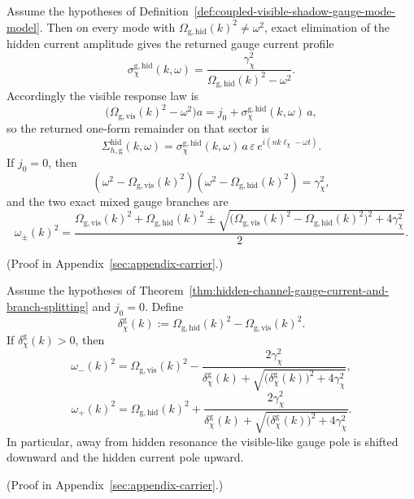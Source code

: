 \begin{theorem}
\label{thm:hidden-channel-gauge-current-and-branch-splitting}
Assume the hypotheses of
Definition~\ref{def:coupled-visible-shadow-gauge-mode-model}. Then on every
mode with \(\Omega_{\mathrm{g,hid}}(k)^2\neq\omega^2\), exact elimination of
the hidden current amplitude gives the returned gauge current profile
\[
\sigma_{\chi}^{\mathrm{g,hid}}(k,\omega)
=
\frac{\gamma_{\chi}^2}{
\Omega_{\mathrm{g,hid}}(k)^2-\omega^2
}.
\]
Accordingly the visible response law is
\[
\bigl(\Omega_{\mathrm{g,vis}}(k)^2-\omega^2\bigr)a
=
j_0+\sigma_{\chi}^{\mathrm{g,hid}}(k,\omega)\,a,
\]
so the returned one-form remainder on that sector is
\[
\Sigma_{h,\mathrm g}^{\mathrm{hid}}(k,\omega)
=
\sigma_{\chi}^{\mathrm{g,hid}}(k,\omega)\,
a\,\varepsilon\,e^{i(nk\ell_{\chi}-\omega t)}.
\]
If \(j_0=0\), then
\[
(\omega^2-\Omega_{\mathrm{g,vis}}(k)^2)
(\omega^2-\Omega_{\mathrm{g,hid}}(k)^2)
=
\gamma_{\chi}^2,
\]
and the two exact mixed gauge branches are
\[
\omega_{\pm}(k)^2
=
\frac{
\Omega_{\mathrm{g,vis}}(k)^2+\Omega_{\mathrm{g,hid}}(k)^2
\pm
\sqrt{
\bigl(\Omega_{\mathrm{g,vis}}(k)^2-\Omega_{\mathrm{g,hid}}(k)^2\bigr)^2
+
4\gamma_{\chi}^2
}
}{2}.
\]
\end{theorem}

(Proof in Appendix~\ref{sec:appendix-carrier}.)

\begin{corollary}
\label{cor:exact-off-resonant-gauge-pole-shifts}
Assume the hypotheses of
Theorem~\ref{thm:hidden-channel-gauge-current-and-branch-splitting} and
\(j_0=0\). Define
\[
\delta_{\chi}^{\mathrm g}(k)
:=
\Omega_{\mathrm{g,hid}}(k)^2-\Omega_{\mathrm{g,vis}}(k)^2.
\]
If \(\delta_{\chi}^{\mathrm g}(k)>0\), then
\[
\omega_-(k)^2
=
\Omega_{\mathrm{g,vis}}(k)^2
-
\frac{2\gamma_{\chi}^2}{
\delta_{\chi}^{\mathrm g}(k)
+
\sqrt{
\bigl(\delta_{\chi}^{\mathrm g}(k)\bigr)^2+4\gamma_{\chi}^2
}
},
\]
\[
\omega_+(k)^2
=
\Omega_{\mathrm{g,hid}}(k)^2
+
\frac{2\gamma_{\chi}^2}{
\delta_{\chi}^{\mathrm g}(k)
+
\sqrt{
\bigl(\delta_{\chi}^{\mathrm g}(k)\bigr)^2+4\gamma_{\chi}^2
}
}.
\]
In particular, away from hidden resonance the visible-like gauge pole is
shifted downward and the hidden current pole upward.
\end{corollary}

(Proof in Appendix~\ref{sec:appendix-carrier}.)

